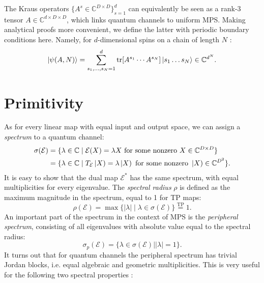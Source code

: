 \noindent The Kraus operators $\{A^s \in \mathbb{C}^{D \times D}\}_{s=1}^d$ can equivalently be seen as a rank-3 tensor $A \in \mathbb{C}^{d \times D \times D}$, which links quantum channels to uniform MPS. Making analytical proofs more convenient, we define the latter with periodic boundary conditions here. Namely, for $d$-dimensional spins on a chain of length $N$ \cite{cirac2021matrix}:
\begin{equation}
	\ket{\psi(A,N)} = \sum_{s_1, \ldots, s_N = 1}^d \tr[A^{s_1} \cdots A^{s_N}]\ket{s_1 \ldots s_N} \in \mathbb{C}^{d^N}.
\end{equation}


\section*{Primitivity} 
\noindent As for every linear map with equal input and output space, we can assign a \textit{spectrum} to a quantum channel:
\begin{align}
\begin{split}
	\sigma(\mathcal{E}) &= \{\lambda \in \mathbb{C} \mid \mathcal{E}(X) = \lambda X \text{ for some nonzero } X \in \mathbb{C}^{D \times D} \} \\
	&= \{\lambda \in \mathbb{C} \mid  T_{\mathcal{E}}\left| X \right) = \lambda \left| X \right) \text{ for some nonzero } \left| X \right) \in \mathbb{C}^{D^2} \}.
\end{split}
\end{align}
It is easy to show that the dual map $\mathcal{E}^*$ has the same spectrum, with equal multiplicities for every eigenvalue. The \textit{spectral radius} $\rho$ is defined as the maximum magnitude in the spectrum, equal to 1 for TP maps:
\begin{equation}
	\rho(\mathcal{E}) = \max\{\vert \lambda \vert \mid \lambda \in \sigma(\mathcal{E})\} \overset{\mathrm{TP}}{=} 1.
\end{equation}
An important part of the spectrum in the context of MPS is the \textit{peripheral spectrum}, consisting of all eigenvalues with absolute value equal to the spectral radius:
\begin{equation}
	\sigma_p(\mathcal{E}) = \{\lambda \in \sigma(\mathcal{E}) \mid \vert\lambda\vert = 1\}.
\end{equation}
It turns out that for quantum channels the peripheral spectrum has trivial Jordan blocks, i.e. equal algebraic and geometric multiplicities. This is very useful for the following two spectral properties \cite{wolf2012channels}:
